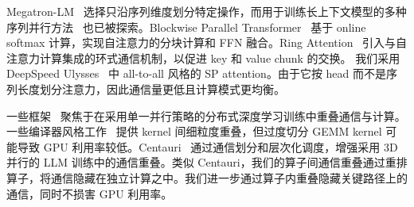 
 Megatron-LM~\cite{shoeybi2019megatron, korthikanti2023reducing} 选择只沿序列维度划分特定操作，而用于训练长上下文模型的多种序列并行方法~\cite{li2024distflashattn, liu2023ring, li2021sequence, gu2024loongtrain} 也已被探索。Blockwise Parallel Transformer~\cite{liu2024blockwise} 基于 online softmax 计算，实现自注意力的分块计算和 FFN 融合。Ring Attention~\cite{liu2023ring, li2021sequence} 引入与自注意力计算集成的环式通信机制，以促进 key 和 value chunk 的交换。
我们采用 DeepSpeed Ulysses~\cite{jacobs2023deepspeed} 中 all-to-all 风格的 SP attention。由于它按 head 而不是序列长度划分注意力，因此通信量更低且计算模式更均衡。

 一些框架~\cite{hashemi2019tictac, li2020pytorch, mahajan2023better, peng2019generic, pytorch_fsdp} 聚焦于在采用单一并行策略的分布式深度学习训练中重叠通信与计算。一些编译器风格工作~\cite{jangda2022breaking, wang2022overlap, pati2024t3} 提供 kernel 间细粒度重叠，但过度切分 GEMM kernel 可能导致 GPU 利用率较低。Centauri~\cite{chen2024centauri} 通过通信划分和层次化调度，增强采用 3D 并行的 LLM 训练中的通信重叠。类似 Centauri，我们的算子间通信重叠通过重排算子，将通信隐藏在独立计算之中。我们进一步通过算子内重叠隐藏关键路径上的通信，同时不损害 GPU 利用率。

